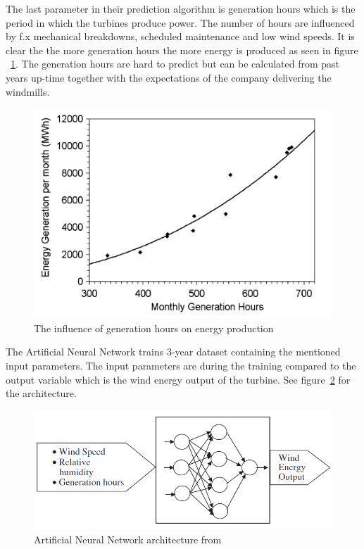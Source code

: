 The last parameter in their prediction algorithm is generation hours which is the period in which the turbines produce power. The number of hours are influenced by f.x mechanical breakdowns, scheduled maintenance and low wind speeds. It is clear the the more generation hours the more energy is produced as seen in figure ~\ref{fig:energyGenerationFromHours}. The generation hours are hard to predict but can be calculated from past years up-time together with the expectations of the company delivering the windmills.  

\begin{figure}[h!]
\centering
\includegraphics[width=0.8\linewidth,natwidth=898,natheight=587]{billeder/GenerationHourVSGeneration.png}
\caption{The influence of generation hours on energy production \cite{WindPowerGenerationUsingANN}}
\label{fig:energyGenerationFromHours}
\end{figure} 

The Artificial Neural Network trains 3-year dataset containing the mentioned input parameters. The input parameters are during the training compared to the output variable which is the wind energy output of the turbine. See figure~\ref{fig:annArchitecture} for the architecture.
\\[0.5cm]
\begin{figure}[h!]
\centering
\includegraphics[width=0.7\linewidth,natwidth=898,natheight=587]{billeder/ANNwindSpeedPrediction.png}
\caption{Artificial Neural Network architecture from \cite{WindPowerGenerationUsingANN}}
\label{fig:annArchitecture}
\end{figure}

